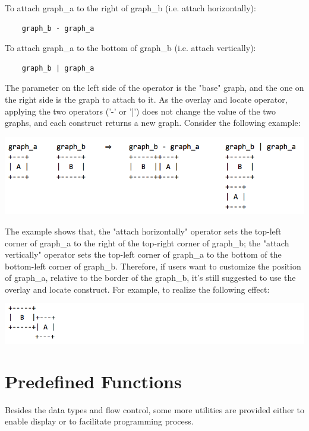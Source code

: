 \documentclass[11pt,letterpaper]{article}
\begin{document}
To attach graph\_a to the right of graph\_b (i.e. attach horizontally):
\begin{lstlisting}
    graph_b - graph_a
\end{lstlisting}

To attach graph\_a to the bottom of graph\_b (i.e. attach vertically):
\begin{lstlisting}
    graph_b | graph_a
\end{lstlisting}

The parameter on the left side of the operator is the "base" graph, and the one on the right side is the graph to attach to it. As the overlay and locate operator, applying the two operators ('-' or '|') does not change the value of the two graphs, and each construct returns a new graph. Consider the following example:

\includegraphics[width=\textwidth]{./graph_02.png}

The example shows that, the "attach horizontally" operator sets the top-left corner of graph\_a to the right of the top-right corner of graph\_b; the "attach vertically" operator sets the top-left corner of graph\_a to the bottom of the bottom-left corner of graph\_b. Therefore, if users want to customize the position of graph\_a, relative to the border of the graph\_b, it's still suggested to use the overlay and locate construct. For example, to realize the following effect:

\includegraphics[width=\textwidth]{./graph_03.png}

\section {Predefined Functions}

Besides the data types and flow control, some more utilities are provided either to enable display or to facilitate programming process.
\end{document}

